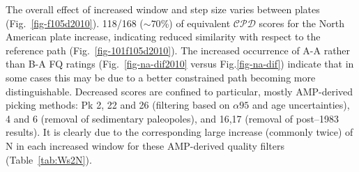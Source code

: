 The overall effect of increased window and step size varies between plates
(Fig.~\ref{fig-f105d2010}). 118/168 (${\sim}70$\%) of equivalent $\mathcal{CPD}$
scores for the North American plate increase, indicating reduced similarity with
respect to the reference path (Fig.~\ref{fig-101f105d2010}). The increased
occurrence of A-A rather than B-A FQ ratings (Fig.~\ref{fig-na-dif2010} versus
Fig.\ref{fig-na-dif}) indicate that in some cases this may be due to a better
constrained path becoming more distinguishable. Decreased scores are confined to
particular, mostly AMP-derived picking methods: Pk 2, 22 and 26 (filtering based
on ${\alpha}95$ and age uncertainties), 4 and 6 (removal of sedimentary
paleopoles), and 16,17 (removal of post–1983 results). It is clearly due to the
corresponding large increase (commonly twice) of N in each increased window for
these AMP-derived quality filters (Table~\ref{tab:Ws2N}).


